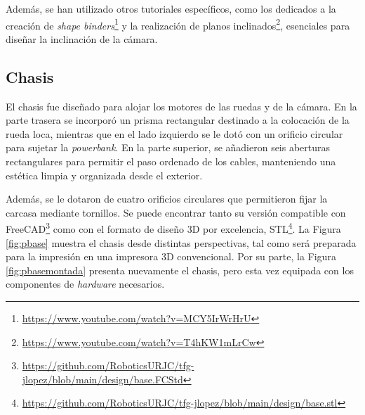 Además, se han utilizado otros tutoriales específicos, como los dedicados a la creación de \textit{shape binders}\footnote{\url{https://www.youtube.com/watch?v=MCY5IrWrHrU}} y la realización de planos inclinados\footnote{\url{https://www.youtube.com/watch?v=T4hKW1mLrCw}}, esenciales para diseñar la inclinación de la cámara.

\subsection{Chasis}

El chasis fue diseñado para alojar los motores de las ruedas y de la cámara. En la parte trasera se incorporó un prisma rectangular destinado a la colocación de la rueda loca, mientras que en el lado izquierdo se le dotó con un orificio circular para sujetar la \textit{powerbank}. En la parte superior, se añadieron seis aberturas rectangulares para permitir el paso ordenado de los cables, manteniendo una estética limpia y organizada desde el exterior.

Además, se le dotaron de cuatro orificios circulares que permitieron fijar la carcasa mediante tornillos. Se puede encontrar tanto su versión compatible con FreeCAD\footnote{\url{https://github.com/RoboticsURJC/tfg-jlopez/blob/main/design/base.FCStd}} como con el formato de diseño 3D por excelencia, STL\footnote{\url{https://github.com/RoboticsURJC/tfg-jlopez/blob/main/design/base.stl}}. La Figura \ref{fig:pbase} muestra el chasis desde distintas perspectivas, tal como será preparada para la impresión en una impresora 3D convencional. Por su parte, la Figura \ref{fig:pbasemontada} presenta nuevamente el chasis, pero esta vez equipada con los componentes de \textit{hardware} necesarios.

